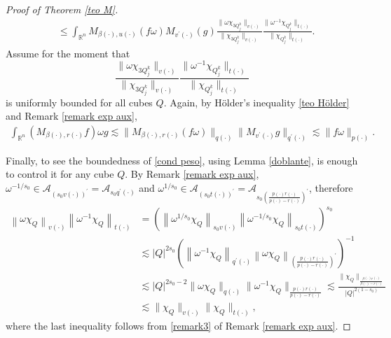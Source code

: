 \documentclass[a4paper,11pt,reqno]{amsart}
\theoremstyle{plain}
\numberwithin{equation}{section}
\theoremstyle{definition}
\newcommand{\R}{{\mathbb{R}^n}}
\begin{document}
\begin{proof}[Proof of Theorem \ref{teo M}]
\begin{align*}
		&\leq \int_{{\R}}M_{{\beta(\cdot)},{u(\cdot)}}(f\omega)M_{v^\prime(\cdot)}(g) \frac{\|\omega\chi_{3Q_j^k}\|_{v(\cdot)}}{\|\chi_{3Q_j^k}\|_{v(\cdot)}} \frac{\|\omega^{-1}\chi_{Q_j^k}\|_{t(\cdot)}}{\|\chi_{Q_j^k}\|_{t(\cdot)}}.
	\end{align*}
	Assume for the moment that
	\begin{equation}\label{cond peso}
		\frac{\|\omega\chi_{3Q_j^k}\|_{v(\cdot)}}{\|\chi_{3Q_j^k}\|_{v(\cdot)}} \frac{\|\omega^{-1}\chi_{Q_j^k}\|_{t(\cdot)}}{\|\chi_{Q_j^k}\|_{t(\cdot)}}
	\end{equation}  
	is uniformly bounded for all cubes $Q$. Again, by Hölder's inequality \ref{teo Hölder} and Remark \ref{remark exp aux},
	\begin{align*}
		\int_{\R} \left(M_{{\beta(\cdot)},{r(\cdot)}}f\right)\omega g\lesssim \|M_{{\beta(\cdot)},{r(\cdot)}}(f\omega)\|_{q(\cdot)}\|M_{v^\prime(\cdot)}g\|_{q^\prime(\cdot)}\lesssim \|f\omega\|_{p(\cdot)}.
	\end{align*}
	
	Finally, to see the boundedness of \eqref{cond peso}, using Lemma \ref{doblante}, is enough to control it for any cube $Q$. By Remark \ref{remark exp aux}, $\omega^{-1/s_0}\in\mathcal{A}_{\left(s_0{v(\cdot)}\right)^\prime}=\mathcal{A}_{s_0{q^\prime(\cdot)}}$ and $\omega^{1/s_0}\in\mathcal{A}_{(s_0{t(\cdot)})^\prime}=\mathcal{A}_{s_0\left(\frac{{p(\cdot)}{r(\cdot)}}{{p(\cdot)}-{r(\cdot)}}\right)^\prime}$, therefore
	\begin{align*}
		\left\|\omega\chi_Q\right\|_{v(\cdot)}\left\|\omega ^{-1}\chi_Q\right\|_{t(\cdot)}&=\left(\left\|\omega^{1/s_0}\chi_Q\right\|_{s_0{v(\cdot)}}\left\|\omega^{-1/s_0}\chi_Q\right\|_{s_0{t(\cdot)}}\right)^{s_0}\\
		&\lesssim|Q|^{2s_0}\left(\left\|\omega^{-1}\chi_Q\right\|_{{q^\prime(\cdot)}}\left\|\omega\chi_Q\right\|_{\left(\frac{{p(\cdot)}{r(\cdot)}}{{p(\cdot)}-{r(\cdot)}}\right)^\prime}\right)^{-1}\\
		&\lesssim |Q|^{2s_0-2}\|\omega\chi_Q\|_{q(\cdot)}\|\omega^{-1}\chi_Q\|_{\frac{{p(\cdot)}{r(\cdot)}}{{p(\cdot)}-{r(\cdot)}}}\lesssim \frac{\|\chi_Q\|_{\frac{{\beta(\cdot)}{r(\cdot)}}{{\beta(\cdot)}-{r(\cdot)}}}}{|Q|^{2(1-s_0)}}\\
		&\lesssim \|\chi_Q\|_{v(\cdot)}\|\chi_Q\|_{t(\cdot)},
	\end{align*}
	where the last inequality follows from \eqref{remark3} of Remark \ref{remark exp aux}. 
\end{proof}
\end{document}
